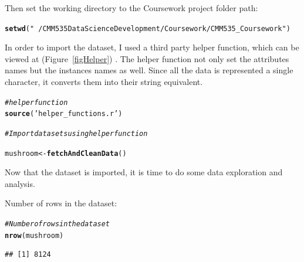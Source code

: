 \documentclass[10pt  ,usenames, dvipsnames]{article}\usepackage[]{graphicx}\usepackage[]{color}
\makeatletter
\newcommand{\hlstr}[1]{\textcolor[rgb]{0.192,0.494,0.8}{#1}}%
\newcommand{\hlcom}[1]{\textcolor[rgb]{0.678,0.584,0.686}{\textit{#1}}}%
\newcommand{\hlstd}[1]{\textcolor[rgb]{0.345,0.345,0.345}{#1}}%
\newcommand{\hlkwb}[1]{\textcolor[rgb]{0.69,0.353,0.396}{#1}}%
\newcommand{\hlkwd}[1]{\textcolor[rgb]{0.737,0.353,0.396}{\textbf{#1}}}%
\newenvironment{kframe}{%
 \def\at@end@of@kframe{}%
 \ifinner\ifhmode%
  \def\at@end@of@kframe{\end{minipage}}%
  \begin{minipage}{\columnwidth}%
 \fi\fi%
 \def\FrameCommand##1{\hskip\@totalleftmargin \hskip-\fboxsep
 \colorbox{shadecolor}{##1}\hskip-\fboxsep
     \hskip-\linewidth \hskip-\@totalleftmargin \hskip\columnwidth}%
 \MakeFramed {\advance\hsize-\width
   \@totalleftmargin\z@ \linewidth\hsize
   \@setminipage}}%
 {\par\unskip\endMakeFramed%
 \at@end@of@kframe}
\newenvironment{knitrout}{}{} %
\makeatother
\begin{document}
Then set the working directory to the Coursework project folder path:
\begin{knitrout}
\color{fgcolor}\begin{kframe}
\begin{alltt}
\hlkwd{setwd}\hlstd{(}\hlstr{"~/CMM535 Data Science Development/Coursework/CMM535_Coursework"}\hlstd{)}
\end{alltt}
\end{kframe}
\end{knitrout}



In order to import the dataset, I used a third party helper function, which can be viewed at (Figure~\ref{figHelper})  .
The helper function not only set the attributes names but the instances names as well. Since all the data is represented a single character, it converts them into their string equivalent.


\begin{knitrout}
\color{fgcolor}\begin{kframe}
\begin{alltt}
\hlcom{#helper function}
\hlkwd{source}\hlstd{(}\hlstr{'helper_functions.r'}\hlstd{)}

\hlcom{#Import datasets using helper function}

\hlstd{mushroom} \hlkwb{<-} \hlkwd{fetchAndCleanData}\hlstd{()}
\end{alltt}
\end{kframe}
\end{knitrout}





Now that the dataset is imported, it is time to do some data exploration and analysis.

Number of rows in the dataset:

\begin{knitrout}
\color{fgcolor}\begin{kframe}
\begin{alltt}
\hlcom{#Number of rows in the dataset}
\hlkwd{nrow}\hlstd{(mushroom)}
\end{alltt}
\end{kframe}
\end{knitrout}


\begin{knitrout}
\color{fgcolor}\begin{kframe}
\begin{verbatim}
## [1] 8124
\end{verbatim}
\end{kframe}
\end{knitrout}
\end{document}
